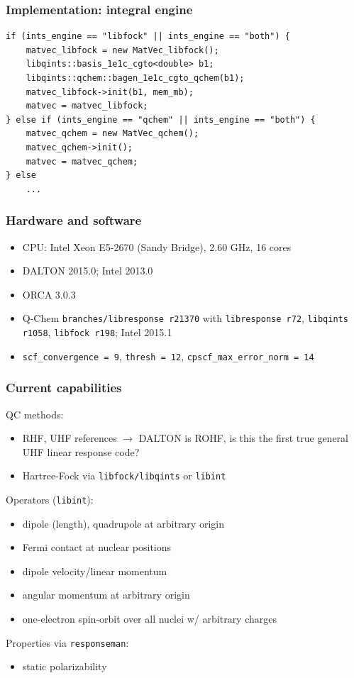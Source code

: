 \documentclass[xcolor=usenames,dvipsnames,svgnames]{beamer}
\begin{document}
\begin{frame}[fragile]
  \frametitle{Implementation: integral engine}
  \scriptsize
  \begin{verbatim}
if (ints_engine == "libfock" || ints_engine == "both") {
    matvec_libfock = new MatVec_libfock();
    libqints::basis_1e1c_cgto<double> b1;
    libqints::qchem::bagen_1e1c_cgto_qchem(b1);
    matvec_libfock->init(b1, mem_mb);
    matvec = matvec_libfock;
} else if (ints_engine == "qchem" || ints_engine == "both") {
    matvec_qchem = new MatVec_qchem();
    matvec_qchem->init();
    matvec = matvec_qchem;
} else
    ...
  \end{verbatim}
\end{frame}

\begin{frame}
  \frametitle{Hardware and software}
  \begin{itemize}
  \item CPU: Intel Xeon E5-2670 (Sandy Bridge), 2.60 GHz, 16 cores
  \item DALTON 2015.0; Intel 2013.0
  \item ORCA 3.0.3
  \item Q-Chem \texttt{branches/libresponse r21370} with \texttt{libresponse r72}, \texttt{libqints r1058}, \texttt{libfock r198}; Intel 2015.1
  \item \texttt{scf\_convergence = 9}, \texttt{thresh = 12}, \texttt{cpscf\_max\_error\_norm = 14}
  \end{itemize}
\end{frame}

\begin{frame}
  \frametitle{Current capabilities}
  QC methods:
  \begin{itemize}
  \item RHF, UHF references \(\rightarrow\) DALTON is ROHF, is this the first true general UHF linear response code?
  \item Hartree-Fock via \texttt{libfock/libqints} or \texttt{libint}
  \end{itemize}
  Operators (\texttt{libint}):
  \begin{itemize}
  \item dipole (length), quadrupole at arbitrary origin
  \item Fermi contact at nuclear positions
  \item dipole velocity/linear momentum
  \item angular momentum at arbitrary origin
  \item one-electron spin-orbit over all nuclei w/ arbitrary charges
  \end{itemize}
  Properties via \texttt{responseman}:
  \begin{itemize}
  \item static polarizability
  \end{itemize}
\end{frame}
\end{document}
